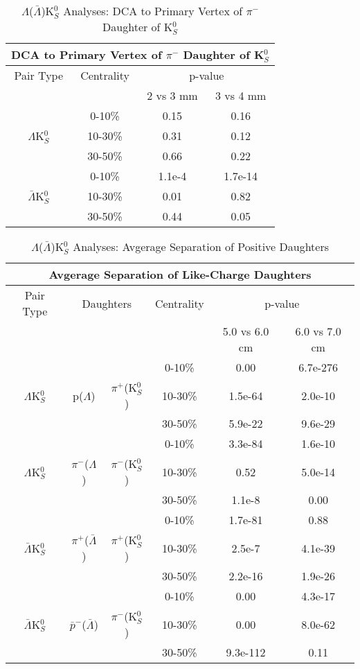 \documentclass[../AnalysisNoteJBuxton.tex]{subfiles}
\begin{document}
\begin{table}
 \centering
 \begin{tabular}{|c|c|c|c|}
 \multicolumn{4}{c}{DCA to Primary Vertex of $\pi^{-}$ Daughter of K$^{0}_{S}$} \\
  \hline
  Pair Type & Centrality & \multicolumn{2}{c|}{p-value} \\
  \cline{3-4}
   & & 2 vs 3 mm & 3 vs 4 mm \\
  \hline
   & 0-10\% & 0.15 & 0.16 \\
  $\Lambda$K$^{0}_{S}$ 
   & 10-30\% & 0.31 & 0.12 \\
   & 30-50\% & 0.66 & 0.22 \\
  \hline
   & 0-10\% & 1.1e-4 & 1.7e-14 \\
  $\bar{\Lambda}$K$^{0}_{S}$ 
   & 10-30\% & 0.01 & 0.82 \\
   & 30-50\% & 0.44 & 0.05 \\
  \hline
 \end{tabular}
 \caption{$\Lambda$($\bar{\Lambda}$)K$^{0}_{S}$ Analyses: DCA to Primary Vertex of $\pi^{-}$ Daughter of K$^{0}_{S}$}
 \label{tab:DcaToPrimVertexNegPionDaughtOfK0LamK0}
\end{table}

\begin{table}
 \centering
 \begin{tabular}{|c|c|c|c|c|c|}
 \multicolumn{6}{c}{Avgerage Separation of Like-Charge Daughters} \\
  \hline
  Pair Type & \multicolumn{2}{|c|}{Daughters} & Centrality & \multicolumn{2}{c|}{p-value} \\
  \cline{5-6}
   & \multicolumn{2}{|c|}{} & & 5.0 vs 6.0 cm & 6.0 vs 7.0 cm \\
  \hline
   & & & 0-10\% & 0.00 & 6.7e-276 \\
  $\Lambda$K$^{0}_{S}$ & p($\Lambda$) & $\pi^{+}$(K$^{0}_{S}$) 
     & 10-30\% & 1.5e-64 & 2.0e-10 \\
   & & & 30-50\% & 5.9e-22 & 9.6e-29 \\
  \hline
   & & & 0-10\% & 3.3e-84 & 1.6e-10 \\
   $\Lambda$K$^{0}_{S}$ & $\pi^{-}$($\Lambda$) & $\pi^{-}$(K$^{0}_{S}$) 
     & 10-30\% & 0.52 & 5.0e-14 \\
   & & & 30-50\% & 1.1e-8 & 0.00 \\
  \hline \hline
   & & & 0-10\% & 1.7e-81 & 0.88 \\
   $\bar{\Lambda}$K$^{0}_{S}$ & $\pi^{+}$($\bar{\Lambda}$) & $\pi^{+}$(K$^{0}_{S}$) 
     & 10-30\% & 2.5e-7 & 4.1e-39 \\
   & & & 30-50\% & 2.2e-16 & 1.9e-26 \\
  \hline
   & & & 0-10\% & 0.00 & 4.3e-17 \\
   $\bar{\Lambda}$K$^{0}_{S}$ & $\bar{p}^{-}$($\bar{\Lambda}$) & $\pi^{-}$(K$^{0}_{S}$)
     & 10-30\% & 0.00 & 8.0e-62 \\
   & & & 30-50\% & 9.3e-112 & 0.11 \\
  \hline
 \end{tabular}
 \caption{$\Lambda$($\bar{\Lambda}$)K$^{0}_{S}$ Analyses: Avgerage Separation of Positive Daughters}
 \label{tab:AvgSepLamK0}
\end{table}
\end{document}
